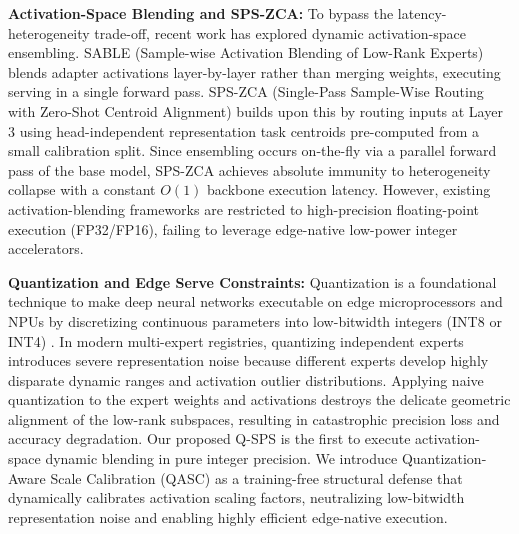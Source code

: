 \textbf{Activation-Space Blending and SPS-ZCA:} To bypass the latency-heterogeneity trade-off, recent work has explored dynamic activation-space ensembling. SABLE (Sample-wise Activation Blending of Low-Rank Experts) \cite{huang2024lorahub} blends adapter activations layer-by-layer rather than merging weights, executing serving in a single forward pass. SPS-ZCA (Single-Pass Sample-Wise Routing with Zero-Shot Centroid Alignment) builds upon this by routing inputs at Layer 3 using head-independent representation task centroids pre-computed from a small calibration split. Since ensembling occurs on-the-fly via a parallel forward pass of the base model, SPS-ZCA achieves absolute immunity to heterogeneity collapse with a constant $O(1)$ backbone execution latency. However, existing activation-blending frameworks are restricted to high-precision floating-point execution (FP32/FP16), failing to leverage edge-native low-power integer accelerators.

\textbf{Quantization and Edge Serve Constraints:} Quantization is a foundational technique to make deep neural networks executable on edge microprocessors and NPUs by discretizing continuous parameters into low-bitwidth integers (INT8 or INT4) \cite{warden2019tinyml, dettmers2023qlora}. In modern multi-expert registries, quantizing independent experts introduces severe representation noise because different experts develop highly disparate dynamic ranges and activation outlier distributions. Applying naive quantization to the expert weights and activations destroys the delicate geometric alignment of the low-rank subspaces, resulting in catastrophic precision loss and accuracy degradation. Our proposed Q-SPS is the first to execute activation-space dynamic blending in pure integer precision. We introduce Quantization-Aware Scale Calibration (QASC) as a training-free structural defense that dynamically calibrates activation scaling factors, neutralizing low-bitwidth representation noise and enabling highly efficient edge-native execution.